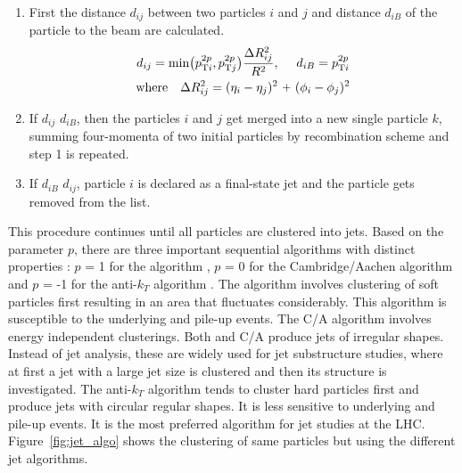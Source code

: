 \begin{enumerate}
\item First the distance $d_{ij}$ between two particles $i$ and $j$ and distance $d_{iB}$ of the particle to the beam are calculated.
 \begin{equation}
\begin{gathered}
d_{ij} = {\rm min}\big(p^{2p}_{{\rm T}i},p^{2p}_{{\rm T}j}\big) \frac{\Delta R^2_{ij}}{R^2}, ~~~~d_{iB} = p^{2p}_{{\rm T}i} \\ {\rm where} ~~~\Delta R^2_{ij} = (\eta_i -\eta_j)^{2} ~\plus (\phi_i -\phi_j)^{2}
\end{gathered}
\end{equation}

\item If $d_{ij}$ \ls $d_{iB}$, then the particles $i$ and $j$ get merged into a new single particle $k$, summing four-momenta of two initial particles by recombination scheme and step 1 is repeated. 
\item If $d_{iB}$ \ls $d_{ij}$, particle $i$ is declared as a final-state jet and the particle gets removed from the list. 
\end{enumerate}
This procedure continues until all particles are clustered into jets. Based on the parameter $p$, there are three important sequential algorithms with distinct properties : $p$ = 1 for the \kt algorithm \cite{Catani:1993hr,Catani:1992zp}, $p$ = 0 for the Cambridge/Aachen algorithm \cite{Dokshitzer:1997in} and $p$ = -1 for the anti-$k_{T}$ algorithm \cite{Cacciari:2008gp}. The \kt algorithm involves clustering of soft particles first resulting in an area that fluctuates considerably. This algorithm is susceptible to the underlying and pile-up events. The C/A algorithm involves energy independent clusterings. Both \kt and C/A produce jets of irregular shapes. Instead of jet analysis, these are widely used for jet substructure studies, where at first a jet with a large jet size is clustered and then its structure is investigated. The anti-$k_{T}$ algorithm tends to cluster hard particles first and produce jets with circular regular shapes. It is less sensitive to underlying and pile-up events. It is the most preferred algorithm for jet studies at the LHC. Figure~\ref{fig:jet_algo} shows the clustering of same particles but using the different jet algorithms. 

